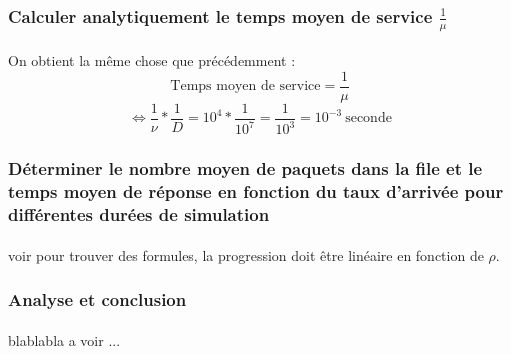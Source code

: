            \subsubsection{Calculer analytiquement le temps moyen de service $\frac{1}{\mu}$}
%
                \paragraph{}
On obtient la même chose que précédemment :
\[  \text{Temps moyen de service} = \frac{1}{\mu} \]
\[ \iff \frac{1}{\nu} * \frac{1}{D} = 10^{4} * \frac{1}{10^{7}} = \frac{1}{10^{3}} = 10^{-3} \ \text{seconde} \]
%
            \subsubsection{Déterminer le nombre moyen de paquets dans la file et le temps moyen de réponse en fonction du taux d'arrivée pour différentes durées de simulation}
%
                \paragraph{}
voir pour trouver des formules, la progression doit être linéaire en fonction de $\rho$.
%
            \subsubsection{Analyse et conclusion}
%
                \paragraph{}
blablabla a voir ...
%
    \clearpage
%

